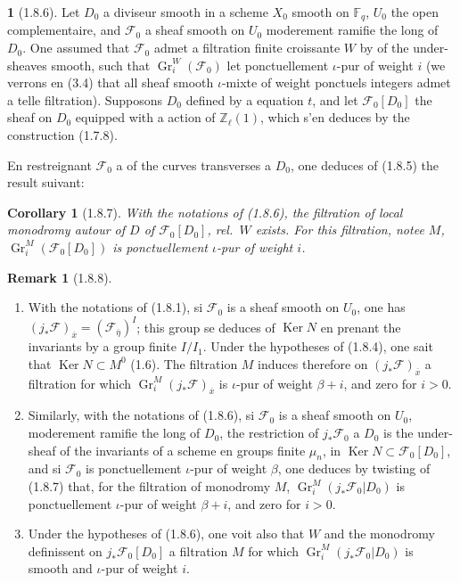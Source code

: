 \documentclass[12pt,a4paper]{article}
\theoremstyle{plain}
\newtheorem{corollary}[theorem]{Corollary}
\theoremstyle{definition}
\newtheorem{remark}[theorem]{Remark}
\theoremstyle{definition}
\newtheorem{para}{}[section]
\theoremstyle{remark}
\DeclareMathOperator{\Gr}{Gr}
\DeclareMathOperator{\Ker}{Ker}
\begin{document}
\begin{para}[1.8.6]
Let $D_0$ a diviseur smooth in a scheme $X_0$ smooth on $\mathbb{F}_q$, $U_0$ the open complementaire, and $\mathscr{F}_0$ a sheaf smooth on $U_0$ moderement ramifie the long of $D_0$. One assumed that $\mathscr{F}_0$ admet a filtration finite croissante $W$ by of the under-sheaves smooth, such that $\Gr_i^W(\mathscr{F}_0)$ let ponctuellement $\iota$-pur of weight $i$ (we verrons en (3.4) that all sheaf smooth $\iota$-mixte of weight ponctuels integers admet a telle filtration). Supposons $D_0$ defined by a equation $t$, and let $\mathscr{F}_0[D_0]$ the sheaf on $D_0$ equipped with a action of $\mathbb{Z}_\ell(1)$, which s'en deduces by the construction (1.7.8).
\end{para}

En restreignant $\mathscr{F}_0$ a of the curves transverses a $D_0$, one deduces of (1.8.5) the result suivant:

\begin{corollary}[1.8.7]
With the notations of (1.8.6), the filtration of local monodromy autour of $D$ of $\mathscr{F}_0[D_0]$, rel.~$W$ exists. For this filtration, notee $M$, $\Gr_i^M(\mathscr{F}_0[D_0])$ is ponctuellement $\iota$-pur of weight $i$.
\end{corollary}

\begin{remark}[1.8.8]
$\;$
\begin{enumerate}[nosep]
\item[1)] With the notations of (1.8.1), si $\mathscr{F}_0$ is a sheaf smooth on $U_0$, one has $(j_* \mathscr{F})_{\overline{x}} = (\mathscr{F}_{\overline{\eta}})^I$; this group se deduces of $\Ker N$ en prenant the invariants by a group finite $I/I_1$. Under the hypotheses of (1.8.4), one sait that $\Ker N \subset M^0$ (1.6). The filtration $M$ induces therefore on $(j_* \mathscr{F})_{\overline{x}}$ a filtration for which $\Gr_i^M(j_* \mathscr{F})_{\overline{x}}$ is $\iota$-pur of weight $\beta + i$, and zero for $i > 0$.
\item[2)] Similarly, with the notations of (1.8.6), si $\mathscr{F}_0$ is a sheaf smooth on $U_0$, moderement ramifie the long of $D_0$, the restriction of $j_* \mathscr{F}_0$ a $D_0$ is the under-sheaf of the invariants of a scheme en groups finite $\mu_n$, in $\Ker N \subset \mathscr{F}_0[D_0]$, and si $\mathscr{F}_0$ is ponctuellement $\iota$-pur of weight $\beta$, one deduces by twisting of (1.8.7) that, for the filtration of monodromy $M$, $\Gr_i^M(j_* \mathscr{F}_0|D_0)$ is ponctuellement $\iota$-pur of weight $\beta + i$, and zero for $i > 0$.
\item[3)] Under the hypotheses of (1.8.6), one voit also that $W$ and the monodromy definissent on $j_* \mathscr{F}_0[D_0]$ a filtration $M$ for which $\Gr_i^M(j_* \mathscr{F}_0|D_0)$ is smooth and $\iota$-pur of weight $i$.
\end{enumerate}
\end{remark}
\end{document}
